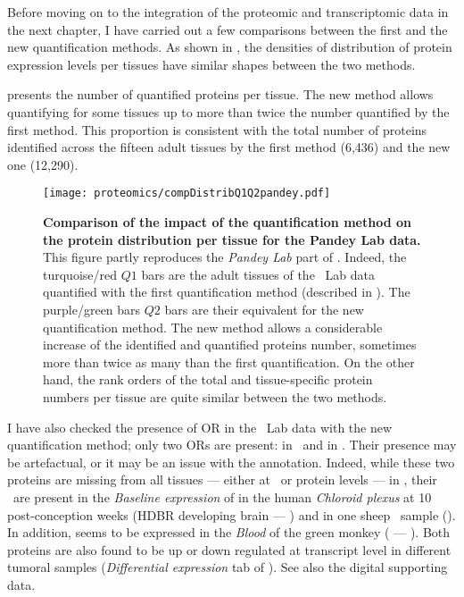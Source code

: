 Before moving on to the integration of the proteomic and transcriptomic data
in the next chapter,
I have carried out a few comparisons
between the first and the new quantification methods.
As shown in ,
the densities of distribution of protein expression levels per tissues
have similar shapes between the two methods.\mybr\

 presents the number of quantified proteins per tissue.
The new method allows quantifying for some tissues
up to more than twice the number quantified by the first method.
This proportion is consistent with the total number of proteins identified
across the fifteen adult tissues
by the first method (6,436)
and the new one (12,290).\mybr\

\begin{figure}[!ht]
    \texttt{[image: proteomics/compDistribQ1Q2pandey.pdf]}\centering
    \vspace{-3.5mm}
    \caption[Comparison of the impact of the quantification method on the
    protein distribution per tissue for Pandey Lab data]{\label{fig:pandeyQ1Q2comp}\textbf{Comparison of
    the impact of the quantification method on the protein distribution per tissue
    for the Pandey Lab data.}
    This figure partly reproduces the \emph{Pandey Lab} part
    of .
    Indeed, the turquoise/red $Q1$ bars are the adult tissues of the \pandey\ Lab data
    quantified with the first quantification method
    (described in ).
    The purple/green bars $Q2$ bars are their equivalent
    for the new quantification method.
    The new method allows a considerable increase of
    the identified and quantified proteins number,
    sometimes more than twice as many than the first quantification.
    On the other hand,
    the rank orders of the total and tissue-specific protein numbers per tissue
    are quite similar between the two methods.
    }
\end{figure}

I have also checked the presence of \gls{OR} in the \pandey\ Lab data
with the new quantification method;
only two \glspl{OR} are present:
 in \Kidney\ and  in \Liver.
Their presence may be artefactual, or it may be an issue with the annotation.
Indeed, while these two proteins are missing from all tissues
--- either at \RNA\ or protein levels
--- in ,
their \mRNAs\ are present
in the \emph{Baseline expression} of 
in the human \textit{Chloroid plexus} at 10 post-conception weeks
(HDBR developing brain --- )
and in one sheep \testis\ sample ().
In addition,  seems to be expressed in the \textit{Blood} of
the green monkey ( --- ).
Both proteins are also found to be up or down regulated at transcript level
in different tumoral samples (\emph{Differential expression} tab of \egxa).
See also the digital supporting data.\mybr\

